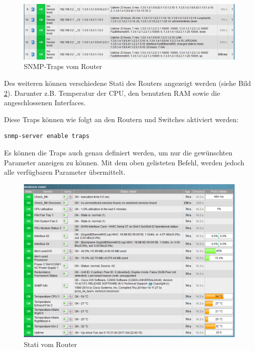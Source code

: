 \begin{figure}[H]
	\centering
	\includegraphics[scale=0.59]{img/EventConsole_cut.PNG}
	\caption{SNMP-Traps vom Router}
	\label{img:console}
\end{figure}

Des weiteren können verschiedene Stati des Routers angezeigt werden (siehe Bild \ref{img:router_monitoring}). Darunter z.B. Temperatur der CPU, den benutzten RAM sowie die angeschlossenen Interfaces.

Diese Traps können wie folgt an den Routern und Switches aktiviert werden:
\begin{lstlisting}[caption={Traps aktivieren},label={lst:traps},language={}]
 snmp-server enable traps
\end{lstlisting}

Es können die Traps auch genau definiert werden, um nur die gewünschten Parameter anzeigen zu können. Mit dem oben gelisteten Befehl, werden jedoch alle verfügbaren Parameter übermittelt.

\begin{figure}[H]
	\centering
	\includegraphics[scale=0.59]{img/checkmk_router.PNG}
	\caption{Stati vom Router}
	\label{img:router_monitoring}
\end{figure}